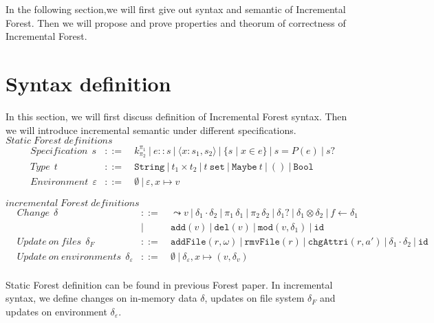 \documentclass[10pt,twoside,a4paper]{article}
\theoremstyle{theorem}
\theoremstyle{lemma}
\theoremstyle{property}
\theoremstyle{definition}
\theoremstyle{assumption}
\def\fst{\pi_1}
\def\snd{\pi_2}
\begin{document}
In the following section,we will first give out syntax and semantic of Incremental Forest. Then we will propose and prove properties and theorum of correctness of Incremental Forest.

\section{Syntax definition}

In this section, we will first discuss definition of Incremental Forest syntax. Then we will introduce incremental semantic under different specifications.\\

$\boxed{Static\; Forest\; definitions}$
\begin{align*}
	& Specification ~~s	& ::= 	& ~k^{\pi_1}_{\pi_2} ~|~ e::s ~|~ \langle x : s_1, s_2 \rangle ~|~ \{s\mid x\in e\} ~|~ s = P(e) ~|~ s? \\
	& Type ~~t & ::= 	& ~\mathtt{String} ~|~ t_1 \times t_2 ~|~ t~\mathtt{set} ~|~ \mathtt{Maybe}~t ~|~ \mathtt{()} ~|~ \mathtt{Bool}\\
	& Environment ~~\varepsilon & ::= & ~\emptyset ~|~ \varepsilon, x\mapsto v
\end{align*}

$\boxed{incremental\;Forest\;definitions}$
\begin{align*}
	& Change ~~\delta & ::= 	& ~\leadsto v ~|~ \delta_1 \cdot \delta_2 ~|~ \fst\,\delta_1 ~|~ \snd\,\delta_2 ~|~ \delta_1? ~|~ \delta_1 \otimes \delta_2 ~|~ f \leftarrow \delta_1\\
	& 		& |		&~ \mathtt{add}(v) ~|~ \mathtt{del}(v) ~|~ \mathtt{mod}(v, \delta_1) ~|~ \mathtt{id}\\
	& Update~on~files ~~\delta_F 	& ::= 	& ~\mathtt{addFile}(r,\omega) ~|~ \mathtt{rmvFile}(r) ~|~ \mathtt{chgAttri}(r,a') ~|~ \delta_1 \cdot \delta_2 ~|~ \mathtt{id}\\
	& Update~on~environments ~~\delta_\varepsilon & ::= & ~\emptyset ~|~ \delta_\varepsilon, x \mapsto (v,\delta_v) \\
\end{align*}

Static Forest definition can be found in previous Forest paper. In incremental syntax, we define changes on in-memory data $\delta$, updates on file system $\delta_F$ and updates on environment $\delta_\varepsilon$. \\
\end{document}
